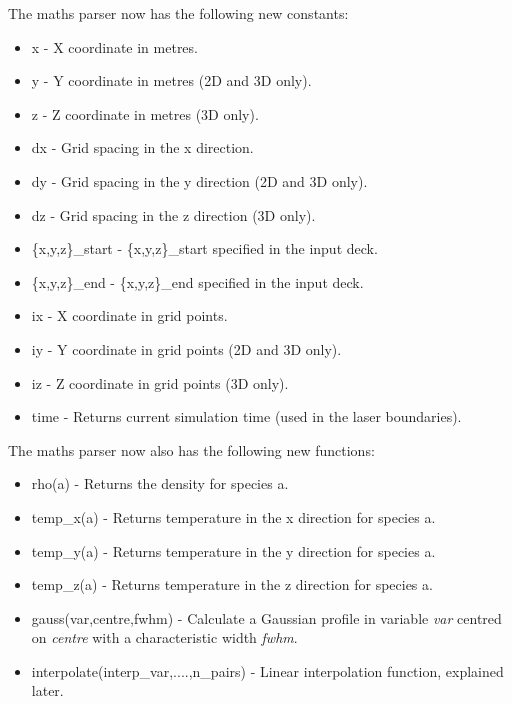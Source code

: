 \documentclass[12pt,a4paper]{article}
\begin{document}
The maths parser now has the following new constants:
\begin{itemize}
\item x - X coordinate in metres.
\item y - Y coordinate in metres (2D and 3D only).
\item z - Z coordinate in metres (3D only).
\item dx - Grid spacing in the x direction.
\item dy - Grid spacing in the y direction (2D and 3D only).
\item dz - Grid spacing in the z direction (3D only).
\item \{x,y,z\}\_start - \{x,y,z\}\_start specified in the input deck.
\item \{x,y,z\}\_end - \{x,y,z\}\_end specified in the input deck.
\item ix - X coordinate in grid points.
\item iy - Y coordinate in grid points (2D and 3D only).
\item iz - Z coordinate in grid points (3D only).
\item time - Returns current simulation time (used in the laser boundaries).
\end{itemize}

The maths parser now also has the following new functions:
\begin{itemize}
\item rho(a) - Returns the density for species a.
\item temp\_x(a) - Returns temperature in the x direction for species a.
\item temp\_y(a) - Returns temperature in the y direction for species a.
\item temp\_z(a) - Returns temperature in the z direction for species a.
\item gauss(var,centre,fwhm) - Calculate a Gaussian profile in variable {\it
    var} centred on {\it centre} with a characteristic width {\it fwhm}.
\item interpolate(interp\_var,....,n\_pairs) - Linear interpolation function,
  explained later.
\end{itemize}
\end{document}
